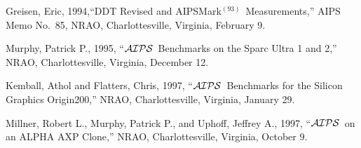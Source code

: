 \documentclass[twoside]{article}
\newcommand{\AIPS}{{$\cal AIPS\/$}}
\newcommand{\OMark}{AIPSMark$^{(93)}$}
\begin{document}
\begin{thebibliography}{9}
 Greisen, Eric, 1994,``DDT Revised and \OMark\
   Measurements,'' AIPS Memo No.~85, NRAO, Charlottesville,
   Virginia, February 9.

 Murphy, Patrick P., 1995, ``\AIPS\ Benchmarks on the
   Sparc Ultra 1 and 2,'' NRAO, Charlottesville, Virginia, December
   12.

 Kemball, Athol and Flatters, Chris, 1997, ``\AIPS\
   Benchmarks for the Silicon Graphics Origin200,'' NRAO,
   Charlottesville, Virginia, January 29.

 Millner, Robert L., Murphy, Patrick P., and Uphoff,
   Jeffrey A., 1997, ``\AIPS\ on an ALPHA AXP Clone,'' NRAO,
   Charlottesville, Virginia, October 9.

\end{thebibliography}
\end{document}
